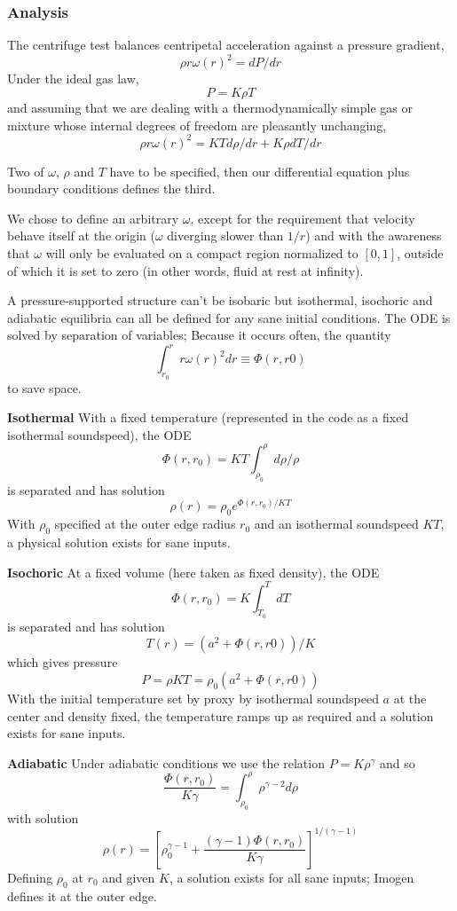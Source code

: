 \subsubsection{Analysis}

The centrifuge test balances centripetal acceleration against a pressure gradient,
\[ \rho r \omega(r)^2 = dP/dr \]
Under the ideal gas law,
\[ P = K \rho T \]
and assuming that we are dealing with a thermodynamically simple gas or mixture whose 
internal degrees of freedom are pleasantly unchanging,
\[ \rho r \omega(r)^2 = K T d\rho/dr + K \rho dT/dr \]

Two of $\omega$, $\rho$ and $T$ have to be specified, then our differential equation
plus boundary conditions defines the third.

We chose to define an arbitrary $\omega$, except for the requirement that velocity behave
itself at the origin ($\omega$ diverging slower than $1/r$) and with the awareness that
 $\omega$ will only be evaluated on a compact region normalized to $[0,1]$, outside of
which it is set to zero (in other words, fluid at rest at infinity).

A pressure-supported structure can't be isobaric but isothermal, isochoric and adiabatic equilibria
can all be defined for any sane initial conditions. The ODE is solved by separation
of variables; Because it occurs often, the quantity
\[ \int_{r_0}^r r \omega(r)^2 dr \equiv \Phi(r,r0) \]
to save space.

\textbf{Isothermal}
With a fixed temperature (represented in the code as a fixed isothermal soundspeed), the ODE
\[ \Phi(r,r_0) = K T \int_{\rho_0}^\rho d\rho / \rho \]
is separated and has solution
\[ \rho(r)  = \rho_0 e^{\Phi(r,r_0)/KT} \]
With $\rho_0$ specified at the outer edge radius $r_0$ and an isothermal soundspeed $KT$,
a physical solution exists for sane inputs.

\textbf{Isochoric}
At a fixed volume (here taken as fixed density), the ODE
\[ \Phi(r,r_0) = K \int_{T_0}^T dT \]
is separated and has solution
\[ T(r) = (a^2 + \Phi(r,r0))/K \]
which gives pressure
\[ P = \rho K T = \rho_0 (a^2 + \Phi(r,r0)) \]
With the initial temperature set by proxy by isothermal soundspeed $a$ at the center
and density fixed, the temperature ramps up as required and a solution exists for sane
inputs.

\textbf{Adiabatic}
Under adiabatic conditions we use the relation $P = K \rho^\gamma$ and so
\[ \frac{\Phi(r,r_0)}{K \gamma} = \int_{\rho_0}^\rho \rho^{\gamma-2} d\rho \]
with solution
\[ \rho(r) = \left[ \rho_0^{\gamma-1} + \frac{(\gamma-1)\Phi(r,r_0)}{K \gamma} \right]^{1/(\gamma-1)} \]
Defining $\rho_0$ at $r_0$ and given $K$, a solution exists for all sane inputs; Imogen
defines it at the outer edge.


